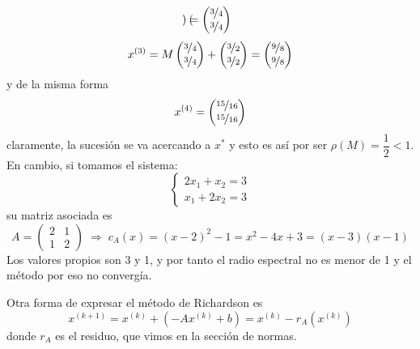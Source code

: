\begin{ejem}
$$\begin{pmatrix}
        \end{pmatrix}=\begin{pmatrix}
            \nicefrac{3}{4} \\ \nicefrac{3}{4} 
        \end{pmatrix} $$
        $$x^{(3)}=M\begin{pmatrix}
            \nicefrac{3}{4} \\ \nicefrac{3}{4} 
        \end{pmatrix} + \begin{pmatrix}
            \nicefrac{3}{2} \\ \nicefrac{3}{2} 
        \end{pmatrix}= \begin{pmatrix}
            \nicefrac{9}{8} \\ \nicefrac{9}{8} 
        \end{pmatrix}$$
        y de la misma forma
        $$x^{(4)}=\begin{pmatrix}
            \nicefrac{15}{16} \\ \nicefrac{15}{16} 
        \end{pmatrix}$$
        claramente, la sucesión se va acercando a $x^*$ y esto es así por ser $\rho(M)=\dfrac{1}{2}<1$. En cambio, si tomamos el sistema: 
        $$\begin{cases}
        2x_1+x_2=3 \\ x_1+2x_2=3
        \end{cases}$$
        su matriz asociada es
        $$A = \begin{pmatrix}
            2 & 1 \\ 1 & 2
        \end{pmatrix} \; \Rightarrow \; c_A(x)=(x-2)^2-1=x^2-4x+3=(x-3)(x-1)$$
        Los valores propios son 3 y 1, y por tanto el radio espectral no es menor de 1 y el método por eso no convergía.
    \end{ejem}
    \begin{obs} Otra forma de expresar el método de Richardson es 
        $$x^{(k+1)}=x^{(k)} + (-Ax^{(k)}+b) = x^{(k)} - r_A(x^{(k)})$$
        donde $r_A$ es el residuo, que vimos en la sección de normas.
    \end{obs}
